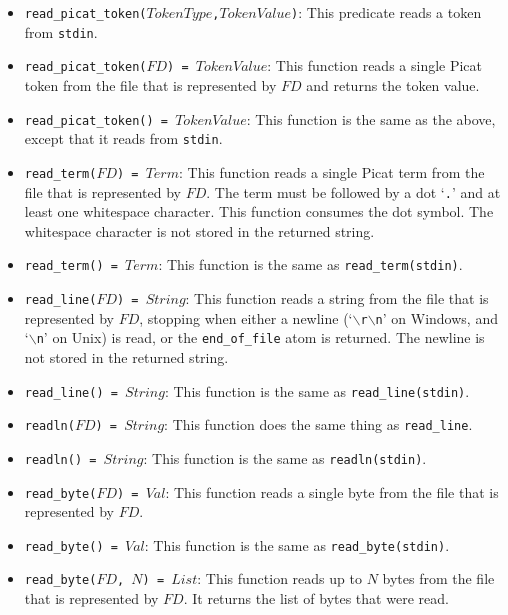 \begin{itemize}
\item \texttt{read\_picat\_token($TokenType$,$TokenValue$)}: This predicate reads a token from \texttt{stdin}.
\item \texttt{read\_picat\_token($FD$) = $TokenValue$}: This function reads a single Picat token from the file that is represented by $FD$ and returns the token value.
\item \texttt{read\_picat\_token() = $TokenValue$}: This function is the same as the above, except that it reads from {\tt stdin}.
\item \texttt{read\_term($FD$) = $Term$}: This function reads a single Picat term from the file that is represented by $FD$.  The term must be followed by a dot  `\texttt{.}' and at least one whitespace character.  This function consumes the dot symbol.  The whitespace character is not stored in the returned string.
\item \texttt{read\_term() = $Term$}: This function is the same as \texttt{read\_term(stdin)}.
\item \texttt{read\_line($FD$) = $String$}: This function reads a string from the file that is represented by $FD$, stopping when either a newline (`\texttt{$\backslash$r$\backslash$n}' on Windows, and `\texttt{$\backslash$n}' on Unix) is read, or the \texttt{end\_of\_file} atom is returned.  The newline is not stored in the returned string.
\item \texttt{read\_line() = $String$}: This function is the same as \texttt{read\_line(stdin)}.
\item \texttt{readln($FD$) = $String$}: This function does the same thing as \texttt{read\_line}.
\item \texttt{readln() = $String$}: This function is the same as \texttt{readln(stdin)}.
\item \texttt{read\_byte($FD$) = $Val$}: This function reads a single byte from the file that is represented by $FD$.
\item \texttt{read\_byte() = $Val$}: This function is the same as \texttt{read\_byte(stdin)}.
\item \texttt{read\_byte($FD$, $N$) = $List$}: This function reads up to $N$ bytes from the file that is represented by $FD$.  It returns the list of bytes that were read. 

\end{itemize}

